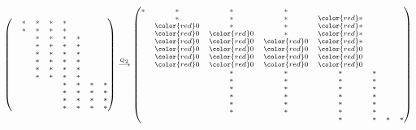 \begin{exm}
\begin{eqnarray}
\begin{scriptsize}
\begin{aligned}
\begin{pmatrix}
          & \ast& \ast& \ast& \ast&  &  &\\
          & \ast& \ast& \ast& \ast&  &  &\\
          &  & \ast& \ast& \ast& \ast&  &\\
          &  & \ast& \ast& \ast& \ast&  &\\
          &  & \ast& \ast& \ast& \ast&  &\\
          &  & \ast& \ast& \ast& \ast&  &\\
          &  & \ast& \ast& \ast& \ast&  &\\
          &  & \ast& \ast& \ast& \ast&  &\\
          &  &  &  & \ast& \ast& \ast& \ast\\
          &  &  &  & \ast& \ast& \ast& \ast\\
          &  &  &  & \ast& \ast& \ast& \ast\\
          &  &  &  & \ast& \ast& \ast& \ast
    \end{pmatrix}
        \overset{{Q}_2}{\longrightarrow}
        \begin{pmatrix}
          \ast& \ast& \ast& \ast&  &  &  &\\
              & \ast& \ast& \ast& {\color{red} \ast}  &  &  &\\
              & {\color{red} 0}& \ast& \ast& {\color{red} \ast}&  &  &\\
              & {\color{red} 0}& {\color{red} 0}& \ast& {\color{red} \ast}  &  &  &\\
              & {\color{red} 0}& {\color{red} 0}& {\color{red} 0}& {\color{red} \ast}  &  &  &\\
          & {\color{red} 0}& {\color{red} 0}& {\color{red} 0}& {\color{red} 0}&  &  &\\
          & {\color{red} 0}& {\color{red} 0}& {\color{red} 0}& {\color{red} 0}&  &  &\\
          & {\color{red} 0}& {\color{red} 0}& {\color{red} 0}& {\color{red} 0}&  &  &\\
          &  & \ast& \ast& \ast& \ast&  &\\
          &  & \ast& \ast& \ast& \ast&  &\\
          &  & \ast& \ast& \ast& \ast&  &\\
          &  & \ast& \ast& \ast& \ast&  &\\
          &  & \ast& \ast& \ast& \ast&  &\\
          &  & \ast& \ast& \ast& \ast&  &\\
          &  &  &  & \ast& \ast& \ast& \ast\\

\end{pmatrix}
\end{aligned}
\end{scriptsize}
\end{eqnarray}
\end{exm}
